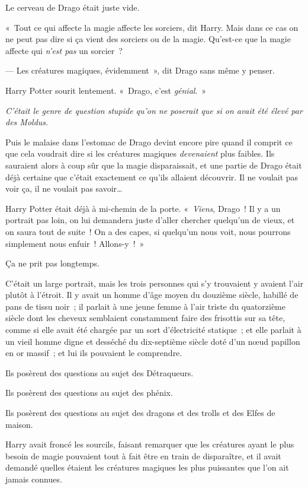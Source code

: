 Le cerveau de Drago était juste vide.

«~Tout ce qui affecte la magie affecte les sorciers, dit Harry.
Mais dans ce cas on ne peut pas dire si ça vient des sorciers ou de la magie.
Qu'est-ce que la magie affecte qui \emph{n'est pas} un sorcier~?

--- Les créatures magiques, évidemment~», dit Drago sans même y penser.

Harry Potter sourit lentement.
«~Drago, c'est \emph{génial}.~»

\emph{C'était le genre de question stupide qu'on ne poserait que si on avait été élevé par des Moldus}.

Puis le malaise dans l'estomac de Drago devint encore pire quand il comprit ce que cela voudrait dire si les créatures magiques \emph{devenaient} plus faibles.
Ils sauraient alors à coup sûr que la magie disparaissait, et une partie de Drago était déjà certaine que c'était exactement ce qu'ils allaient découvrir.
Il ne voulait pas voir ça, il ne voulait pas savoir…

Harry Potter était déjà à mi-chemin de la porte.
«~\emph{Viens}, Drago~!
Il y a un portrait pas loin, on lui demandera juste d'aller chercher quelqu'un de vieux, et on saura tout de suite~!
On a des capes, si quelqu'un nous voit, nous pourrons simplement nous enfuir~!
Allons-y~!~»

\later

Ça ne prit pas longtemps.

C'était un large portrait, mais les trois personnes qui s'y trouvaient y avaient l'air plutôt à l'étroit.
Il y avait un homme d'âge moyen du douzième siècle, habillé de pans de tissu noir~; il parlait à une jeune femme à l'air triste du quatorzième siècle dont les cheveux semblaient constamment faire des frisottis sur sa tête, comme si elle avait été chargée par un sort d'électricité statique~; et elle parlait à un vieil homme digne et desséché du dix-septième siècle doté d'un nœud papillon en or massif~; et lui ils pouvaient le comprendre.

Ils posèrent des questions au sujet des Détraqueurs.

Ils posèrent des questions au sujet des phénix.

Ils posèrent des questions au sujet des dragons et des trolls et des Elfes de maison.

Harry avait froncé les sourcils, faisant remarquer que les créatures ayant le plus besoin de magie pouvaient tout à fait être en train de disparaître, et il avait demandé quelles étaient les créatures magiques les plus puissantes que l'on ait jamais connues.

